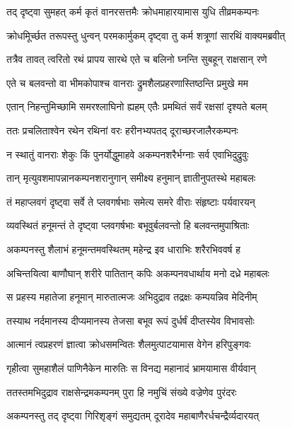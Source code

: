 
\twolineshloka
{तद् दृष्ट्वा सुमहत् कर्म कृतं वानरसत्तमैः}
{क्रोधमाहारयामास युधि तीव्रमकम्पनः} %

\twolineshloka
{क्रोधमूिर्च्छत तरूपस्तु धुन्वन् परमकार्मुकम्}
{दृष्ट्वा तु कर्म शत्रूणां सारथिं वाक्यमब्रवीत्} %

\twolineshloka
{तत्रैव तावत् त्वरितो रथं प्रापय सारथे}
{एते च बलिनो घ्नन्ति सुबहून् राक्षसान् रणे} %

\twolineshloka
{एते च बलवन्तो वा भीमकोपाश्च वानराः}
{द्रुमशैलप्रहरणास्तिष्ठन्ति प्रमुखे मम} %

\twolineshloka
{एतान् निहन्तुमिच्छामि समरश्लाघिनो ह्यहम्}
{एतैः प्रमथितं सर्वं रक्षसां दृश्यते बलम्} %

\twolineshloka
{ततः प्रचलिताश्वेन रथेन रथिनां वरः}
{हरीनभ्यपतद् दूराच्छरजालैरकम्पनः} %

\twolineshloka
{न स्थातुं वानराः शेकुः किं पुनर्योद्धुमाहवे}
{अकम्पनशरैर्भग्नाः सर्व एवाभिदुद्रुवुः} %

\twolineshloka
{तान् मृत्युवशमापन्नानकम्पनशरानुगान्}
{समीक्ष्य हनुमान् ज्ञातीनुपतस्थे महाबलः} %

\twolineshloka
{तं महाप्लवगं दृष्ट्वा सर्वे ते प्लवगर्षभाः}
{समेत्य समरे वीराः संहृष्टाः पर्यवारयन्} %

\twolineshloka
{व्यवस्थितं हनूमन्तं ते दृष्ट्वा प्लवगर्षभाः}
{बभूवुर्बलवन्तो हि बलवन्तमुपाश्रिताः} %

\twolineshloka
{अकम्पनस्तु शैलाभं हनूमन्तमवस्थितम्}
{महेन्द्र इव धाराभिः शरैरभिववर्ष ह} %

\twolineshloka
{अचिन्तयित्वा बाणौघान् शरीरे पातितान् कपिः}
{अकम्पनवधार्थाय मनो दध्रे महाबलः} %

\twolineshloka
{स प्रहस्य महातेजा हनूमान् मारुतात्मजः}
{अभिदुद्राव तद्रक्षः कम्पयन्निव मेदिनीम्} %

\twolineshloka
{तस्याथ नर्दमानस्य दीप्यमानस्य तेजसा}
{बभूव रूपं दुर्धर्षं दीप्तस्येव विभावसोः} %

\twolineshloka
{आत्मानं त्वप्रहरणं ज्ञात्वा क्रोधसमन्वितः}
{शैलमुत्पाटयामास वेगेन हरिपुङ्गवः} %

\twolineshloka
{गृहीत्वा सुमहाशैलं पाणिनैकेन मारुतिः}
{स विनद्य महानादं भ्रामयामास वीर्यवान्} %

\twolineshloka
{ततस्तमभिदुद्राव राक्षसेन्द्रमकम्पनम्}
{पुरा हि नमुचिं संख्ये वज्रेणेव पुरंदरः} %

\twolineshloka
{अकम्पनस्तु तद् दृष्ट्वा गिरिशृङ्गं समुद्यतम्}
{दूरादेव महाबाणैरर्धचन्द्रैर्व्यदारयत्} %

